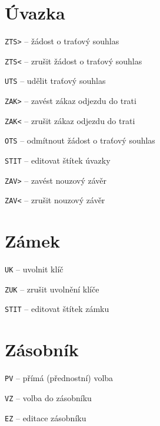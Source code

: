 \documentclass[12pt,a4paper,landscape]{article}
\begin{document}
\begin{multicols}{3}
\section{Úvazka}
\begin{compactitem}
	\item \texttt{ZTS>} -- žádost o traťový souhlas
	\item \texttt{ZTS<} -- zrušit žádost o traťový souhlas
	\item \texttt{UTS} -- udělit traťový souhlas
	\item \texttt{ZAK>} -- zavést zákaz odjezdu do trati
	\item \texttt{ZAK<} -- zrušit zákaz odjezdu do trati
	\item \texttt{OTS} -- odmítnout žádost o traťový souhlas
	\item \texttt{STIT} -- editovat štítek úvazky
	\item \texttt{ZAV>} -- zavést nouzový závěr
	\item \texttt{ZAV<} -- zrušit nouzový závěr	
\end{compactitem}

\section{Zámek}
\begin{compactitem}
	\item \texttt{UK} -- uvolnit klíč
	\item \texttt{ZUK} -- zrušit uvolnění klíče
	\item \texttt{STIT} -- editovat štítek zámku
\end{compactitem}

\section{Zásobník}
\begin{compactitem}
	\item \texttt{PV} -- přímá (přednostní) volba
	\item \texttt{VZ} -- volba do zásobníku
	\item \texttt{EZ} -- editace zásobníku
\end{compactitem}

\end{multicols}
\end{document}
